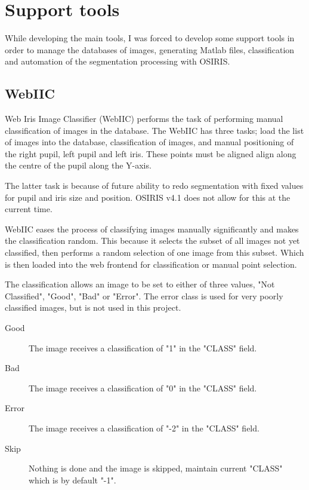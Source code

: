 \section{Support tools}
\label{sec:support}

While developing the main tools, I was forced to develop some support tools in
order to manage the databases of images, generating Matlab files, classification
and automation of the segmentation processing with OSIRIS\cite{osiris}.


\subsection{WebIIC}
\label{sec:webiic}
Web Iris Image Classifier (WebIIC)\cite{webiic} performs the task of performing
manual classification of images in the database.  The WebIIC has three tasks;
load the list of images into the database, classification of images, and manual
positioning of the right pupil, left pupil and left iris. These points must be
aligned align along the centre of the pupil along the Y-axis.

The latter task is because of future ability to redo segmentation with fixed
values for pupil and iris size and position.  OSIRIS v4.1 does not allow for
this at the current time.

WebIIC eases the process of classifying images manually significantly and makes
the classification random.  This because it selects the subset of all images not
yet classified, then performs a random selection of one image from this subset.
Which is then loaded into the web frontend for classification or manual point
selection.

The classification allows an image to be set to either of three values,
"Not Classified", "Good", "Bad" or "Error". The error class is used for very
poorly classified images, but is not used in this project.

\begin{description}
\item [Good] The image receives a classification of "1" in the "CLASS" field.
\item [Bad]  The image receives a classification of "0" in the "CLASS" field.
\item [Error] The image receives a classification of "-2" in the "CLASS" field.
\item [Skip] Nothing is done and the image is skipped, maintain current "CLASS"
	which is by default "-1".
\end{description}



